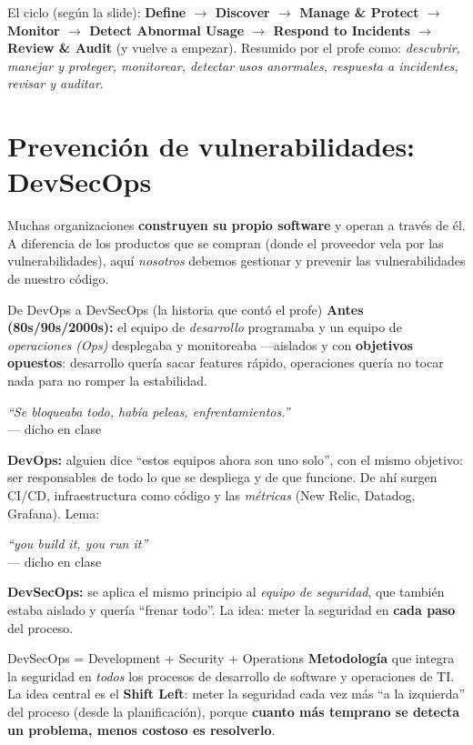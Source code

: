 \documentclass[11pt,a4paper]{article}
\newcommand{\prof}[1]{\par\medskip\noindent\textit{``#1''}\\[-2pt]\hspace*{1em}%
  {\footnotesize\textcolor{black!60}{--- dicho en clase}}\par\medskip\noindent}
\begin{document}
\noindent El ciclo (según la slide): \textbf{Define $\to$ Discover $\to$ Manage \& Protect $\to$
Monitor $\to$ Detect Abnormal Usage $\to$ Respond to Incidents $\to$ Review \& Audit} (y vuelve
a empezar). Resumido por el profe como: \emph{descubrir, manejar y proteger, monitorear,
detectar usos anormales, respuesta a incidentes, revisar y auditar}.

\section{Prevención de vulnerabilidades: DevSecOps}

Muchas organizaciones \textbf{construyen su propio software} y operan a través de él. A
diferencia de los productos que se compran (donde el proveedor vela por las vulnerabilidades),
aquí \emph{nosotros} debemos gestionar y prevenir las vulnerabilidades de nuestro código.

\begin{anecbox}{De DevOps a DevSecOps (la historia que contó el profe)}
\textbf{Antes (80s/90s/2000s):} el equipo de \emph{desarrollo} programaba y un equipo de
\emph{operaciones (Ops)} desplegaba y monitoreaba —aislados y con \textbf{objetivos opuestos}:
desarrollo quería sacar features rápido, operaciones quería no tocar nada para no romper la
estabilidad. \prof{Se bloqueaba todo, había peleas, enfrentamientos.}%
\textbf{DevOps:} alguien dice ``estos equipos ahora son uno solo'', con el mismo objetivo: ser
responsables de todo lo que se despliega y de que funcione. De ahí surgen CI/CD, infraestructura
como código y las \emph{métricas} (New Relic, Datadog, Grafana). Lema: \prof{\emph{you build it,
you run it}}%
\textbf{DevSecOps:} se aplica el mismo principio al \emph{equipo de seguridad}, que también
estaba aislado y quería ``frenar todo''. La idea: meter la seguridad en \textbf{cada paso} del
proceso.
\end{anecbox}

\begin{defbox}{DevSecOps = Development + Security + Operations}
\textbf{Metodología} que integra la seguridad en \emph{todos} los procesos de desarrollo de
software y operaciones de TI. La idea central es el \textbf{Shift Left}: meter la seguridad cada
vez más ``a la izquierda'' del proceso (desde la planificación), porque \textbf{cuanto más
temprano se detecta un problema, menos costoso es resolverlo}.
\end{defbox}
\end{document}
